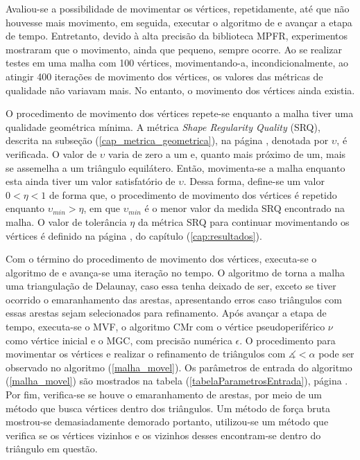 Avaliou-se a possibilidade de movimentar os vértices, repetidamente, até que não houvesse mais movimento, em seguida, executar o algoritmo de  e avançar a etapa de tempo. Entretanto, devido à alta precisão da biblioteca MPFR, experimentos mostraram que o movimento, ainda que pequeno, sempre ocorre. Ao se realizar testes em uma malha com 100 vértices, movimentando-a, incondicionalmente, ao atingir 400 iterações de movimento dos vértices, os valores das métricas de qualidade não variavam mais. No entanto, o movimento dos vértices ainda existia. 

O procedimento de movimento dos vértices repete-se enquanto a malha tiver uma qualidade geométrica mínima. A métrica {\it Shape Regularity Quality} (SRQ), descrita na subseção (\ref{cap_metrica_geometrica}), na página \pageref{cap_metrica_geometrica}, denotada  por $\upsilon$, é verificada. O valor de $\upsilon$ varia de zero a um e, quanto mais próximo de um, mais se assemelha a um triângulo equilátero. Então, movimenta-se a malha enquanto esta ainda tiver um valor satisfatório de $\upsilon$. Dessa forma, define-se um valor $0 < \eta < 1$ de forma que, o procedimento de movimento dos vértices é repetido enquanto $\upsilon_{min} > \eta$, em que $\upsilon_{min}$ é o menor valor da medida SRQ encontrado na malha. O valor de tolerância $\eta$ da métrica SRQ para continuar movimentando  os vértices é definido na página \pageref{cap:resultados}, do capítulo (\ref{cap:resultados}).

Com o término do procedimento de movimento dos vértices, executa-se o algoritmo de  e avança-se uma iteração no tempo. O algoritmo de  torna a malha uma triangulação de Delaunay, caso essa tenha deixado de ser, exceto se tiver ocorrido o emaranhamento das arestas, apresentando erros caso triângulos com essas arestas sejam selecionados para refinamento. Após avançar a etapa de tempo, executa-se o MVF, o algoritmo CMr com o vértice pseudoperiférico $\nu$ como vértice inicial e o MGC, com precisão numérica $\epsilon$. O procedimento para movimentar os vértices e realizar o refinamento de triângulos com $\measuredangle < \alpha$ pode ser observado no algoritmo (\ref{malha_movel}). Os parâmetros de entrada do algoritmo (\ref{malha_movel}) são mostrados na tabela (\ref{tabelaParametrosEntrada}), página \pageref{tabelaParametrosEntrada}. Por fim, verifica-se se houve o emaranhamento de arestas, por meio de um método que busca vértices dentro dos triângulos. Um método de força bruta mostrou-se demasiadamente demorado portanto, utilizou-se um método que verifica se os vértices vizinhos e os vizinhos desses encontram-se dentro do triângulo em questão.

